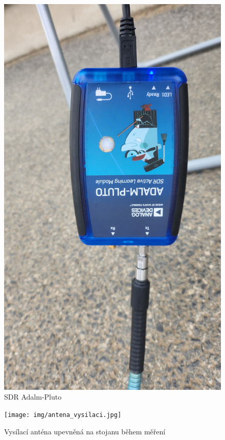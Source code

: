 \begin{figure}[h!]
    \centering
    \includegraphics[angle=270,scale=0.06]{img/SDR-pluto.jpg}
    \caption{SDR Adalm-Pluto}
    \label{fig:my_label}
\end{figure}

\begin{figure}[h!]
    \centering
    \texttt{[image: img/antena\_vysilaci.jpg]}
    \caption{Vysílací anténa upevněná na stojanu během měření}
    \label{fig:my_label}
\end{figure}

